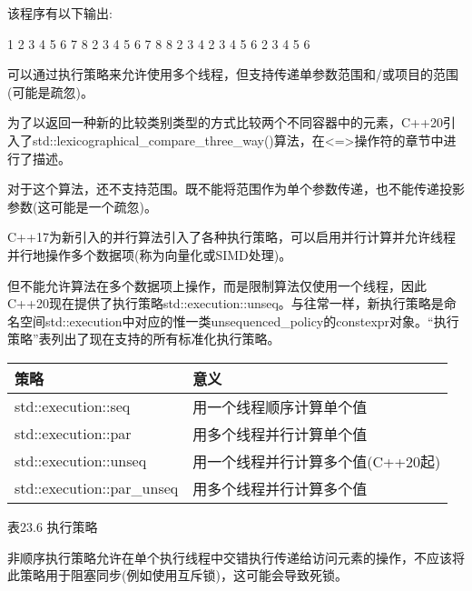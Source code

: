 该程序有以下输出:

\begin{shell}
1 2 3 4 5 6 7 8
2 3 4 5 6 7 8 8
2 3 4 2 3 4 5 6
2 3 4 5 6
\end{shell}

可以通过执行策略来允许使用多个线程，但支持传递单参数范围和/或项目的范围(可能是疏忽)。


为了以返回一种新的比较类别类型的方式比较两个不同容器中的元素，C++20引入了std::lexicographical\_compare\_three\_way()算法，在<=>操作符的章节中进行了描述。

对于这个算法，还不支持范围。既不能将范围作为单个参数传递，也不能传递投影参数(这可能是一个疏忽)。


C++17为新引入的并行算法引入了各种执行策略，可以启用并行计算并允许线程并行地操作多个数据项(称为向量化或SIMD处理)。

但不能允许算法在多个数据项上操作，而是限制算法仅使用一个线程，因此C++20现在提供了执行策略std::execution::unseq。与往常一样，新执行策略是命名空间std::execution中对应的惟一类unsequenced\_policy的constexpr对象。“执行策略”表列出了现在支持的所有标准化执行策略。

\begin{longtable}[c]{|l|l|}
\hline
\textbf{策略}     & \textbf{意义}                                           \\ \hline
\endfirsthead
%
\endhead
%
std::execution::seq & 用一个线程顺序计算单个值     \\ \hline
std::execution::par & 用多个线程并行计算单个值 \\ \hline
std::execution::unseq      & 用一个线程并行计算多个值(C++20起) \\ \hline
std::execution::par\_unseq & 用多个线程并行计算多个值        \\ \hline
\end{longtable}

\begin{center}
表23.6 执行策略
\end{center}

非顺序执行策略允许在单个执行线程中交错执行传递给访问元素的操作，不应该将此策略用于阻塞同步(例如使用互斥锁)，这可能会导致死锁。

